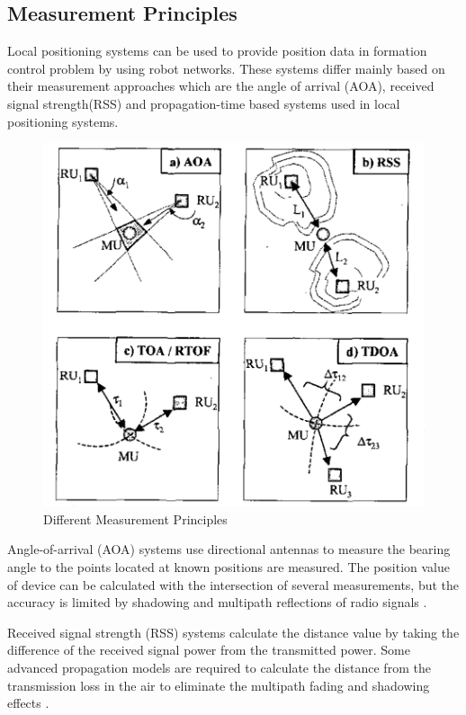 \subsection{Measurement Principles} \label{sssec:num1}
Local positioning systems can be used to provide position data in formation control problem by using robot networks. These systems differ mainly based on their measurement approaches which are the angle of arrival (AOA), received signal strength(RSS) and propagation-time based systems used in local positioning systems. 

\begin{figure}[H]
	\caption{Different Measurement Principles \cite{20}}
	\centering
	\includegraphics[scale = 0.4]{measurement}
\end{figure} 

\newpage
Angle-of-arrival (AOA) systems use directional antennas to measure the bearing angle to the points located at known positions are measured. The position value of device can be calculated with the intersection of several measurements, but the accuracy is limited by shadowing and multipath reflections of radio signals \cite{20}. 

Received signal strength (RSS) systems calculate the distance value by taking the difference of the received signal power from the transmitted power. Some advanced propagation models are required to calculate the distance from the transmission loss in the air to eliminate the multipath fading and shadowing effects \cite{21}. 

